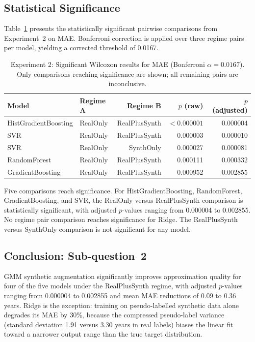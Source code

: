 \documentclass[11pt,a4paper]{report}
\begin{document}
\subsection{Statistical Significance}

Table~\ref{tab:exp2_sig} presents the statistically significant pairwise comparisons from
Experiment~2 on MAE. Bonferroni correction is applied over three regime pairs per model, yielding
a corrected threshold of 0.0167.

\begin{table}[h]
  \centering
  \caption{Experiment 2: Significant Wilcoxon results for MAE (Bonferroni $\alpha = 0.0167$). Only
  comparisons reaching significance are shown; all remaining pairs are inconclusive.}
  \label{tab:exp2_sig}
  \begin{tabular}{llrrr}
    \toprule
    \textbf{Model} & \textbf{Regime A} & \textbf{Regime B} & \textbf{$p$ (raw)} & \textbf{$p$ (adjusted)} \\
    \midrule
    HistGradientBoosting & RealOnly & RealPlusSynth & $<0.000001$ & 0.000004 \\
    SVR                  & RealOnly & RealPlusSynth & 0.000003    & 0.000010 \\
    SVR                  & RealOnly & SynthOnly     & 0.000027    & 0.000081 \\
    RandomForest         & RealOnly & RealPlusSynth & 0.000111    & 0.000332 \\
    GradientBoosting     & RealOnly & RealPlusSynth & 0.000952    & 0.002855 \\
    \bottomrule
  \end{tabular}
\end{table}

Five comparisons reach significance. For HistGradientBoosting, RandomForest, GradientBoosting, and
SVR, the RealOnly versus RealPlusSynth comparison is statistically significant, with adjusted
$p$-values ranging from 0.000004 to 0.002855. No regime pair comparison reaches significance for
Ridge. The RealPlusSynth versus SynthOnly comparison is not significant for any model.

\subsection{Conclusion: Sub-question~2}

GMM synthetic augmentation significantly improves approximation quality for four of the five models
under the RealPlusSynth regime, with adjusted $p$-values ranging from 0.000004 to 0.002855 and
mean MAE reductions of 0.09 to 0.36 years. Ridge is the exception: training on pseudo-labelled
synthetic data alone degrades its MAE by 30\%, because the compressed pseudo-label variance
(standard deviation 1.91 versus 3.30 years in real labels) biases the linear fit toward a narrower
output range than the true target distribution.
\end{document}
